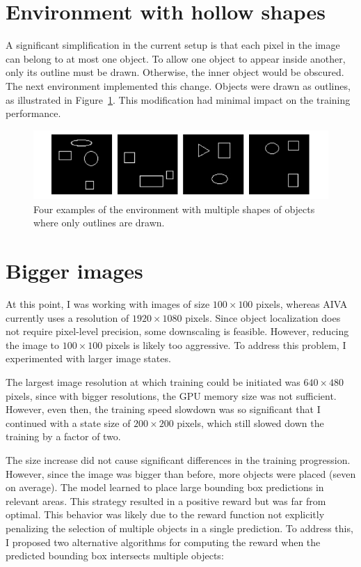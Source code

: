 \documentclass[
  digital,     %
  oneside,     %
  nosansbold,  %
  nocolorbold, %
  lof,         %
  lot,         %
]{fithesis4}
\begin{document}
\section{Environment with hollow shapes}
A significant simplification in the current setup is that each pixel in the image can belong to at most one object. To allow one object to appear inside another, only its outline must be drawn. Otherwise, the inner object would be obscured. The next environment implemented this change. Objects were drawn as outlines, as illustrated in Figure~\ref{fig:env5}. This modification had minimal impact on the training performance.

\begin{figure}
    \centering
    \includegraphics[width=1\linewidth]{env_examples/env5.pdf}
    \caption{Four examples of the environment with multiple shapes of objects where only outlines are drawn.}
    \label{fig:env5}
\end{figure}

\section{Bigger images}
At this point, I was working with images of size $100\times100$ pixels, whereas AIVA currently uses a resolution of $1920\times1080$ pixels. Since object localization does not require pixel-level precision, some downscaling is feasible. However, reducing the image to $100\times100$ pixels is likely too aggressive. To address this problem, I experimented with larger image states.

The largest image resolution at which training could be initiated was $640\times480$ pixels, since with bigger resolutions, the GPU memory size was not sufficient. However, even then, the training speed slowdown was so significant that I continued with a state size of $200\times200$ pixels, which still slowed down the training by a factor of two.

The size increase did not cause significant differences in the training progression. However, since the image was bigger than before, more objects were placed (seven on average). The model learned to place large bounding box predictions in relevant areas. This strategy resulted in a positive reward but was far from optimal. This behavior was likely due to the reward function not explicitly penalizing the selection of multiple objects in a single prediction. To address this, I proposed two alternative algorithms for computing the reward when the predicted bounding box intersects multiple objects:
\end{document}
